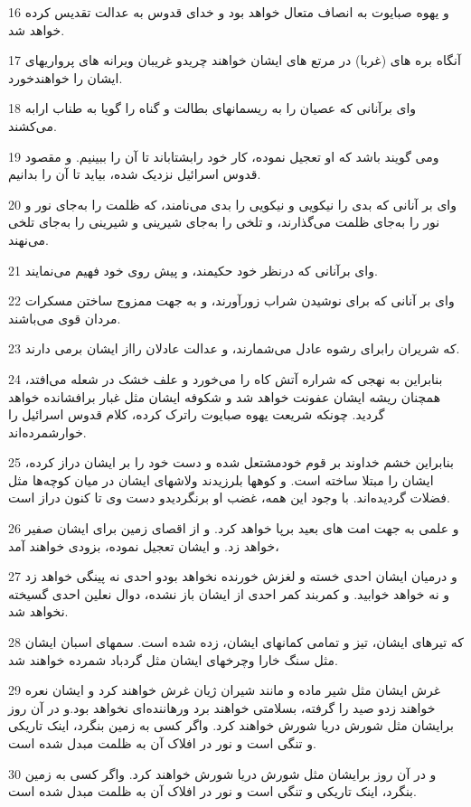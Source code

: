 \par 16 و یهوه صبایوت به انصاف متعال خواهد بود و خدای قدوس به عدالت تقدیس کرده خواهد شد.
\par 17 آنگاه بره های (غربا) در مرتع های ایشان خواهند چریدو غریبان ویرانه های پرواریهای ایشان را خواهندخورد.
\par 18 وای برآنانی که عصیان را به ریسمانهای بطالت و گناه را گویا به طناب ارابه می‌کشند.
\par 19 ومی گویند باشد که او تعجیل نموده، کار خود رابشتاباند تا آن را ببینیم. و مقصود قدوس اسرائیل نزدیک شده، بیاید تا آن را بدانیم.
\par 20 وای بر آنانی که بدی را نیکویی و نیکویی را بدی می‌نامند، که ظلمت را به‌جای نور و نور را به‌جای ظلمت می‌گذارند، و تلخی را به‌جای شیرینی و شیرینی را به‌جای تلخی می‌نهند.
\par 21 وای برآنانی که درنظر خود حکیمند، و پیش روی خود فهیم می‌نمایند.
\par 22 وای بر آنانی که برای نوشیدن شراب زورآورند، و به جهت ممزوج ساختن مسکرات مردان قوی می‌باشند.
\par 23 که شریران رابرای رشوه عادل می‌شمارند، و عدالت عادلان رااز ایشان برمی دارند.
\par 24 بنابراین به نهجی که شراره آتش کاه را می‌خورد و علف خشک در شعله می‌افتد، همچنان ریشه ایشان عفونت خواهد شد و شکوفه ایشان مثل غبار برافشانده خواهد گردید. چونکه شریعت یهوه صبایوت راترک کرده، کلام قدوس اسرائیل را خوارشمرده‌اند.
\par 25 بنابراین خشم خداوند بر قوم خودمشتعل شده و دست خود را بر ایشان دراز کرده، ایشان را مبتلا ساخته است. و کوهها بلرزیدند ولاشهای ایشان در میان کوچه‌ها مثل فضلات گردیده‌اند. با وجود این همه، غضب او برنگردیدو دست وی تا کنون دراز است.
\par 26 و علمی به جهت امت های بعید برپا خواهد کرد. و از اقصای زمین برای ایشان صفیر خواهد زد. و ایشان تعجیل نموده، بزودی خواهند آمد،
\par 27 و درمیان ایشان احدی خسته و لغزش خورنده نخواهد بودو احدی نه پینگی خواهد زد و نه خواهد خوابید. و کمربند کمر احدی از ایشان باز نشده، دوال نعلین احدی گسیخته نخواهد شد.
\par 28 که تیرهای ایشان، تیز و تمامی کمانهای ایشان، زده شده است. سمهای اسبان ایشان مثل سنگ خارا وچرخهای ایشان مثل گردباد شمرده خواهند شد.
\par 29 غرش ایشان مثل شیر ماده و مانند شیران ژیان غرش خواهند کرد و ایشان نعره خواهند زدو صید را گرفته، بسلامتی خواهند برد ورهاننده‌ای نخواهد بود.و در آن روز برایشان مثل شورش دریا شورش خواهند کرد. واگر کسی به زمین بنگرد، اینک تاریکی و تنگی است و نور در افلاک آن به ظلمت مبدل شده است.
\par 30 و در آن روز برایشان مثل شورش دریا شورش خواهند کرد. واگر کسی به زمین بنگرد، اینک تاریکی و تنگی است و نور در افلاک آن به ظلمت مبدل شده است.
 
